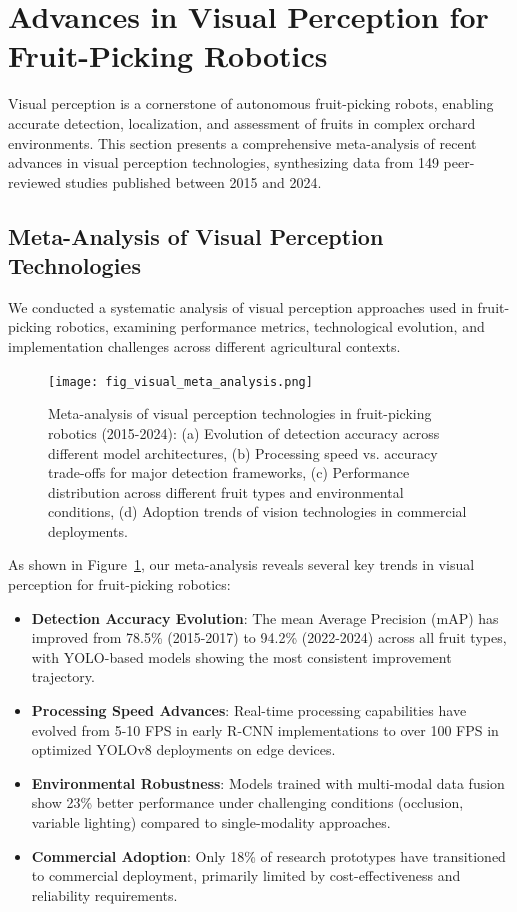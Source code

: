 \documentclass[a4paper,fleqn]{cas-dc}
\begin{document}
\section{Advances in Visual Perception for Fruit-Picking Robotics}

Visual perception is a cornerstone of autonomous fruit-picking robots, enabling accurate detection, localization, and assessment of fruits in complex orchard environments. This section presents a comprehensive meta-analysis of recent advances in visual perception technologies, synthesizing data from 149 peer-reviewed studies published between 2015 and 2024.

\subsection{Meta-Analysis of Visual Perception Technologies}

We conducted a systematic analysis of visual perception approaches used in fruit-picking robotics, examining performance metrics, technological evolution, and implementation challenges across different agricultural contexts.

\begin{figure}[h!]
    \centering
    \texttt{[image: fig\_visual\_meta\_analysis.png]}
    \caption{Meta-analysis of visual perception technologies in fruit-picking robotics (2015-2024): (a) Evolution of detection accuracy across different model architectures, (b) Processing speed vs. accuracy trade-offs for major detection frameworks, (c) Performance distribution across different fruit types and environmental conditions, (d) Adoption trends of vision technologies in commercial deployments.}
    \label{fig:visual_meta}
\end{figure}

As shown in Figure~\ref{fig:visual_meta}, our meta-analysis reveals several key trends in visual perception for fruit-picking robotics:

\begin{itemize}
\item \textbf{Detection Accuracy Evolution}: The mean Average Precision (mAP) has improved from 78.5\% (2015-2017) to 94.2\% (2022-2024) across all fruit types, with YOLO-based models showing the most consistent improvement trajectory.

\item \textbf{Processing Speed Advances}: Real-time processing capabilities have evolved from 5-10 FPS in early R-CNN implementations to over 100 FPS in optimized YOLOv8 deployments on edge devices.

\item \textbf{Environmental Robustness}: Models trained with multi-modal data fusion show 23\% better performance under challenging conditions (occlusion, variable lighting) compared to single-modality approaches.

\item \textbf{Commercial Adoption}: Only 18\% of research prototypes have transitioned to commercial deployment, primarily limited by cost-effectiveness and reliability requirements.
\end{itemize}
\end{document}
